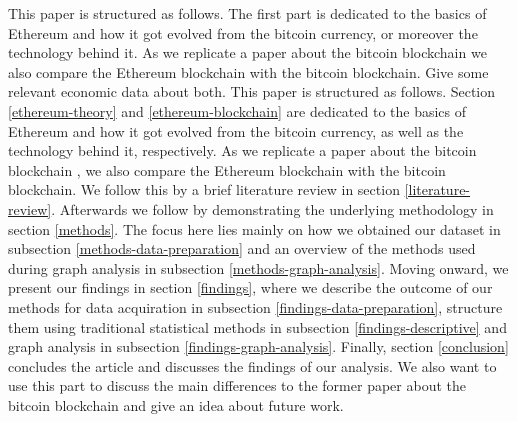 This paper is structured as follows. The first part is dedicated to the basics of Ethereum and how it got evolved from the bitcoin currency, or moreover the technology behind it. As we replicate a paper about the bitcoin blockchain \cite{lischke2016analyzing} we also compare the Ethereum blockchain with the bitcoin blockchain. Give some relevant economic data about both.
This paper is structured as follows. 
Section \ref{ethereum-theory} and \ref{ethereum-blockchain} are dedicated to the basics of Ethereum and how it got evolved from the bitcoin currency, as well as the technology behind it, respectively. 
As we replicate a paper about the bitcoin blockchain \cite{lischke2016analyzing}, we also compare the Ethereum blockchain with the bitcoin blockchain. We follow this by a brief literature review in section \ref{literature-review}.
Afterwards we follow by demonstrating the underlying methodology in section \ref{methods}. 
The focus here lies mainly on how we obtained our dataset in subsection \ref{methods-data-preparation} and an overview of the methods used during graph analysis in subsection \ref{methods-graph-analysis}. 
Moving onward, we present our findings in section \ref{findings}, where we describe the outcome of our methods for data acquiration in subsection \ref{findings-data-preparation}, structure them using traditional statistical methods in subsection \ref{findings-descriptive} and graph analysis in subsection \ref{findings-graph-analysis}.
Finally, section \ref{conclusion} concludes the article and discusses the findings of our analysis. 
We also want to use this part to discuss the main differences to the former paper about the bitcoin blockchain and give an idea about future work. 
